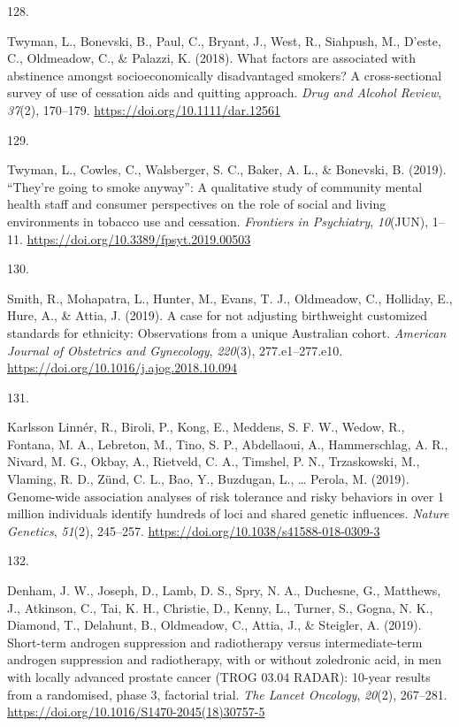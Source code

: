 \documentclass[11pt, a4paper]{awesome-cv}
\newlength{\csllabelwidth}
\newcommand{\CSLLeftMargin}[1]{\parbox[t]{\csllabelwidth}{#1}}
\newcommand{\CSLRightInline}[1]{\parbox[t]{\linewidth - \csllabelwidth}{#1}}
\begin{document}
\leavevmode\hypertarget{ref-twyman_what_2018}{}%
\CSLLeftMargin{128. }
\CSLRightInline{Twyman, L., Bonevski, B., Paul, C., Bryant, J., West,
R., Siahpush, M., D'este, C., Oldmeadow, C., \& Palazzi, K. (2018). What
factors are associated with abstinence amongst socioeconomically
disadvantaged smokers? A cross-sectional survey of use of cessation aids
and quitting approach. \emph{Drug and Alcohol Review}, \emph{37}(2),
170--179. \url{https://doi.org/10.1111/dar.12561}}

\leavevmode\hypertarget{ref-twyman_theyre_2019}{}%
\CSLLeftMargin{129. }
\CSLRightInline{Twyman, L., Cowles, C., Walsberger, S. C., Baker, A. L.,
\& Bonevski, B. (2019). {``They're going to smoke anyway''}: A
qualitative study of community mental health staff and consumer
perspectives on the role of social and living environments in tobacco
use and cessation. \emph{Frontiers in Psychiatry}, \emph{10}(JUN),
1--11. \url{https://doi.org/10.3389/fpsyt.2019.00503}}

\leavevmode\hypertarget{ref-smith_case_2019}{}%
\CSLLeftMargin{130. }
\CSLRightInline{Smith, R., Mohapatra, L., Hunter, M., Evans, T. J.,
Oldmeadow, C., Holliday, E., Hure, A., \& Attia, J. (2019). A case for
not adjusting birthweight customized standards for ethnicity:
Observations from a unique Australian cohort. \emph{American Journal of
Obstetrics and Gynecology}, \emph{220}(3), 277.e1--277.e10.
\url{https://doi.org/10.1016/j.ajog.2018.10.094}}

\leavevmode\hypertarget{ref-karlsson_linner_genome-wide_2019}{}%
\CSLLeftMargin{131. }
\CSLRightInline{Karlsson Linnér, R., Biroli, P., Kong, E., Meddens, S.
F. W., Wedow, R., Fontana, M. A., Lebreton, M., Tino, S. P., Abdellaoui,
A., Hammerschlag, A. R., Nivard, M. G., Okbay, A., Rietveld, C. A.,
Timshel, P. N., Trzaskowski, M., Vlaming, R. D., Zünd, C. L., Bao, Y.,
Buzdugan, L., \ldots{} Perola, M. (2019). Genome-wide association
analyses of risk tolerance and risky behaviors in over 1 million
individuals identify hundreds of loci and shared genetic influences.
\emph{Nature Genetics}, \emph{51}(2), 245--257.
\url{https://doi.org/10.1038/s41588-018-0309-3}}

\leavevmode\hypertarget{ref-denham_short-term_2019}{}%
\CSLLeftMargin{132. }
\CSLRightInline{Denham, J. W., Joseph, D., Lamb, D. S., Spry, N. A.,
Duchesne, G., Matthews, J., Atkinson, C., Tai, K. H., Christie, D.,
Kenny, L., Turner, S., Gogna, N. K., Diamond, T., Delahunt, B.,
Oldmeadow, C., Attia, J., \& Steigler, A. (2019). Short-term androgen
suppression and radiotherapy versus intermediate-term androgen
suppression and radiotherapy, with or without zoledronic acid, in men
with locally advanced prostate cancer (TROG 03.04 RADAR): 10-year
results from a randomised, phase 3, factorial trial. \emph{The Lancet
Oncology}, \emph{20}(2), 267--281.
\url{https://doi.org/10.1016/S1470-2045(18)30757-5}}
\end{document}

